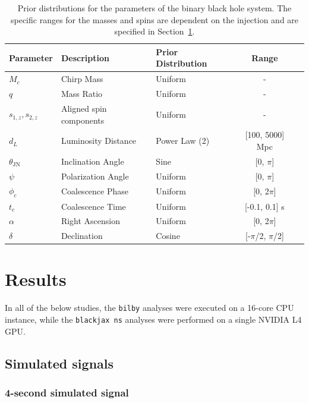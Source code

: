 \documentclass[fleqn,usenatbib]{mnras}
\begin{document}
\begin{table}[h!]
\setlength{\tabcolsep}{3pt} %
\centering
\caption{Prior distributions for the parameters of the binary black hole
system. The specific ranges for the masses and spins
 are dependent on the injection and are specified in Section~\ref{sec:results}.}
\label{tab:priors}
\begin{tabular}{l l l c c}
\hline
\hline
\textbf{Parameter} & \textbf{Description} & \textbf{Prior Distribution} & \textbf{Range}\\
\hline
$M_c$ & Chirp Mass & Uniform & - \\
$q$ & Mass Ratio & Uniform & - \\
$s_{1,z}, s_{2,z}$ & Aligned spin components & Uniform & - \\
$d_L$ & Luminosity Distance & Power Law (2) & [100, 5000] Mpc \\
$\theta_{\textrm{JN}}$ & Inclination Angle & Sine & [0, $\pi$] \\
$\psi$ & Polarization Angle & Uniform & [0, $\pi$] \\
$\phi_c$ & Coalescence Phase & Uniform & [0, 2$\pi$] \\
$t_c$ & Coalescence Time & Uniform & [-0.1, 0.1] s\\
$\alpha$ & Right Ascension & Uniform & [0, 2$\pi$] \\
$\delta$ & Declination & Cosine & [-$\pi$/2, $\pi$/2] \\
\hline
\hline
\end{tabular}
\end{table}


\section{Results}
\label{sec:results}

In all of the below studies, the \texttt{bilby} analyses
were executed on a 16-core CPU instance, while the \texttt{blackjax ns}
analyses were performed on a single NVIDIA L4 GPU.

\subsection{Simulated signals}

\subsubsection{4-second simulated signal}
\end{document}
